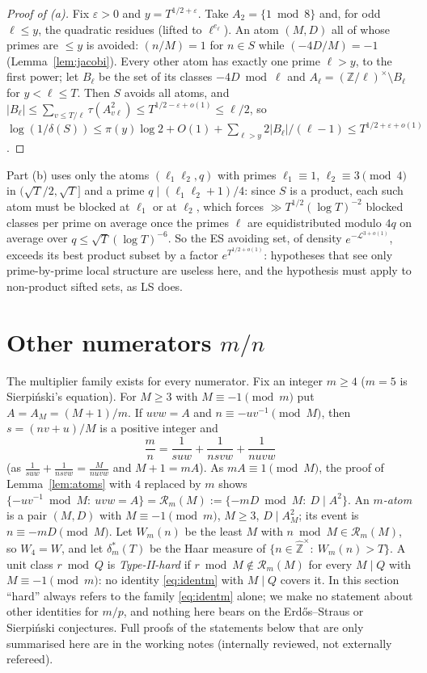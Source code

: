 \documentclass[11pt,reqno]{amsart}
\theoremstyle{definition}
\newcommand{\cR}{\mathcal R}
\newcommand{\Lc}{\mathcal L}
\begin{document}
\begin{proof}[Proof of (a)]
Fix $\varepsilon>0$ and $y=T^{1/2+\varepsilon}$.  Take $A_2=\{1\bmod8\}$ and, for odd $\ell\le y$, the
quadratic residues (lifted to $\ell^{e_\ell}$).  An atom $(M,D)$ all of whose primes are
$\le y$ is avoided: $(n/M)=1$ for $n\in S$ while $(-4D/M)=-1$
(Lemma~\ref{lem:jacobi}).  Every other atom has exactly one prime $\ell>y$, to the first
power; let $B_\ell$ be the set of its classes $-4D\bmod\ell$ and $A_\ell=(\mathbb Z/\ell)^\times\setminus B_\ell$
for $y<\ell\le T$.  Then $S$ avoids all atoms, and
$|B_\ell|\le\sum_{v\le T/\ell}\tau(A_{v\ell}^2)\le T^{1/2-\varepsilon+o(1)}\le\ell/2$, so
$\log(1/\delta(S))\le\pi(y)\log2+O(1)+\sum_{\ell>y}2|B_\ell|/(\ell-1)\le T^{1/2+\varepsilon+o(1)}$.
\end{proof}

Part (b) \cite[Prop.~4.1(b)]{O16} uses only the atoms $(\ell_1\ell_2,q)$ with
primes $\ell_1\equiv1$, $\ell_2\equiv3\pmod4$ in $(\sqrt T/2,\sqrt T]$ and a prime
$q\mid(\ell_1\ell_2+1)/4$: since $S$ is a product, each such atom must be blocked
at $\ell_1$ or at $\ell_2$, which forces $\gg T^{1/2}(\log T)^{-2}$ blocked classes per
prime on average once the primes $\ell$ are equidistributed modulo $4q$ on
average over $q\le\sqrt T(\log T)^{-6}$.  So the ES avoiding set, of density
$e^{-\Lc^{3+o(1)}}$, exceeds its best product subset by a factor $e^{T^{1/2+o(1)}}$:
hypotheses that see only prime-by-prime local structure are useless here,
and the hypothesis must apply to non-product sifted sets, as LS does.

\section{Other numerators \texorpdfstring{$m/n$}{m/n}}\label{sec:mn}

The multiplier family exists for every numerator.  Fix an integer $m\ge4$
($m=5$ is Sierpi\'nski's equation).  For $M\ge3$ with $M\equiv-1\pmod m$ put
$A=A_M=(M+1)/m$.  If $uvw=A$ and $n\equiv-uv^{-1}\pmod M$, then $s=(nv+u)/M$ is a
positive integer and
\begin{equation}\label{eq:identm}
 \frac mn=\frac1{suw}+\frac1{nsvw}+\frac1{nuvw}
\end{equation}
(as $\frac1{suw}+\frac1{nsvw}=\frac{M}{nuvw}$ and $M+1=mA$).  As $mA\equiv1\pmod M$, the
proof of Lemma~\ref{lem:atoms} with $4$ replaced by $m$ shows
$\{-uv^{-1}\bmod M:\ uvw=A\}=\cR_m(M):=\{-mD\bmod M:\ D\mid A^2\}$.  An
\emph{$m$-atom} is a pair $(M,D)$ with $M\equiv-1\pmod m$, $M\ge3$, $D\mid A_M^2$; its
event is $n\equiv-mD\pmod M$.  Let $W_m(n)$ be the least $M$ with $n\bmod M\in\cR_m(M)$, so
$W_4=W$, and let $\delta_m^*(T)$ be the Haar measure of $\{n\in\hat{\mathbb Z}^\times:\ W_m(n)>T\}$.
A unit class $r\bmod Q$ is \emph{Type-II-hard} if $r\bmod M\notin\cR_m(M)$ for every
$M\mid Q$ with $M\equiv-1\pmod m$: no identity \eqref{eq:identm} with $M\mid Q$ covers it.
In this section ``hard'' always refers to the family \eqref{eq:identm} alone;
we make no statement about other identities for $m/p$, and nothing here bears
on the Erd\H{o}s--Straus or Sierpi\'nski conjectures.  Full proofs of the
statements below that are only summarised here are in the working notes
\cite{MN,MN2} (internally reviewed, not externally refereed).
\end{document}
